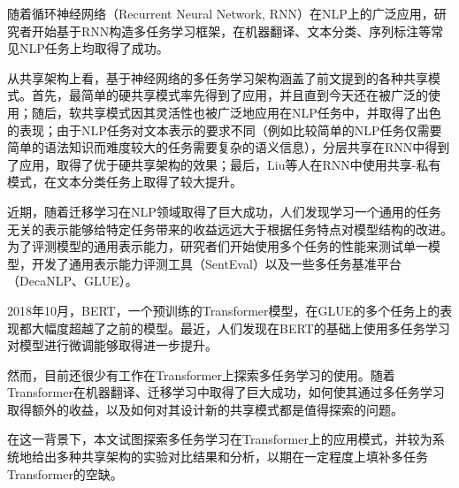 随着循环神经网络（Recurrent Neural Network, RNN）在NLP上的广泛应用，研究者开始基于RNN构造多任务学习框架，在机器翻译\cite{DBLP:conf/acl/DongWHYW15}、文本分类\cite{DBLP:conf/ijcai/LiuQH16}\cite{DBLP:conf/acl/LiuQH17}、序列标注\cite{DBLP:conf/acl/SogaardG16}等常见NLP任务上均取得了成功。

从共享架构上看，基于神经网络的多任务学习架构涵盖了前文提到的各种共享模式。首先，最简单的硬共享模式率先得到了应用\cite{DBLP:conf/icml/CollobertW08}，并且直到今天还在被广泛的使用\cite{liu2019multi}；随后，软共享模式因其灵活性也被广泛地应用在NLP任务中，并取得了出色的表现\cite{1705.08142}；由于NLP任务对文本表示的要求不同（例如比较简单的NLP任务仅需要简单的语法知识而难度较大的任务需要复杂的语义信息），分层共享在RNN中得到了应用\cite{DBLP:conf/acl/SogaardG16}，取得了优于硬共享架构的效果；最后，Liu等人在RNN中使用共享-私有模式\cite{DBLP:conf/ijcai/LiuQH16}，在文本分类任务上取得了较大提升。

近期，随着迁移学习在NLP领域取得了巨大成功\cite{DBLP:conf/naacl/PetersNIGCLZ18}\cite{radford2018improving}\cite{devlin2018bert}，人们发现学习一个通用的任务无关的表示能够给特定任务带来的收益远远大于根据任务特点对模型结构的改进。为了评测模型的通用表示能力，研究者们开始使用多个任务的性能来测试单一模型，开发了通用表示能力评测工具（SentEval\cite{DBLP:conf/lrec/ConneauK18}）以及一些多任务基准平台（DecaNLP\cite{mccann2018natural}、GLUE\cite{DBLP:conf/emnlp/WangSMHLB18}）。

2018年10月，BERT，一个预训练的Transformer模型，在GLUE的多个任务上的表现都大幅度超越了之前的模型\cite{devlin2018bert}。最近，人们发现在BERT的基础上使用多任务学习对模型进行微调能够取得进一步提升\cite{liu2019multi}\cite{anonymous2018bam!}。

然而，目前还很少有工作在Transformer上探索多任务学习的使用。随着Transformer在机器翻译\cite{DBLP:conf/nips/VaswaniSPUJGKP17}、迁移学习\cite{radford2018improving}\cite{devlin2018bert}中取得了巨大成功，如何使其通过多任务学习取得额外的收益，以及如何对其设计新的共享模式都是值得探索的问题。

在这一背景下，本文试图探索多任务学习在Transformer上的应用模式，并较为系统地给出多种共享架构的实验对比结果和分析，以期在一定程度上填补多任务Transformer的空缺。